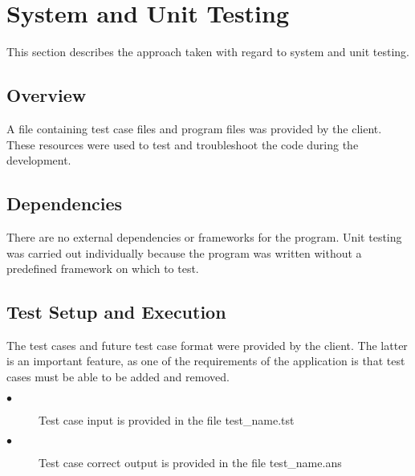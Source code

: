 
\chapter{System  and Unit Testing}

This section describes the approach taken with regard to system and unit testing. 

\section{Overview}
A file containing test case files and program files was provided by the client.  These
resources were used to test and troubleshoot the code during the development.

\section{Dependencies}
There are no external dependencies or frameworks for the program. Unit testing was carried out individually because the program was written without a predefined framework on which to test. 

\section{Test Setup and Execution}
The test cases and future test case format were provided by the client.  The latter is an important feature,
as one of the requirements of the application is that test cases must be able to be added and removed.

\begin{description}
\item [$\bullet$] Test case input is provided in the file test\_name.tst
\item [$\bullet$] Test case correct output is provided in the file test\_name.ans
\end{description}